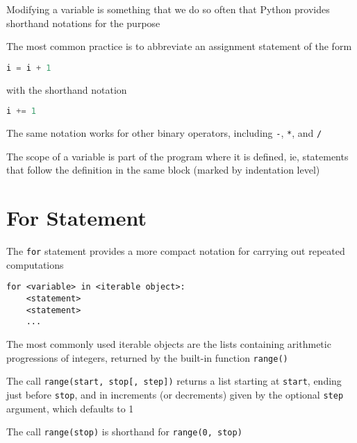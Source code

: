\documentclass[8pt,a4paper,compress]{beamer}
\begin{document}
\begin{frame}[fragile]
\pause

Modifying a variable is something that we do so often that Python provides shorthand notations for the purpose

\pause
\bigskip

The most common practice is to abbreviate an assignment statement of the form 

\begin{lstlisting}[language=Python]
i = i + 1
\end{lstlisting}

with the shorthand notation

\begin{lstlisting}[language=Python]
i += 1
\end{lstlisting}

\pause
\bigskip

The same notation works for other binary operators, including \lstinline{-}, \lstinline{*}, and \lstinline{/}

\pause
\bigskip

The scope of a variable is part of the program where it is defined, ie, statements that follow the definition in the same block (marked by indentation level)
\end{frame}

\section{For Statement}
\begin{frame}[fragile]
\pause

The \lstinline{for} statement provides a more compact notation for carrying out repeated computations

\pause
\smallskip

\begin{lstlisting}[language={}]
for <variable> in <iterable object>:
    <statement>
    <statement>
    ...
\end{lstlisting}

\pause
\bigskip

The most commonly used iterable objects are the lists containing arithmetic progressions of integers, returned by the built-in function \lstinline{range()}

\pause
\bigskip

The call \lstinline{range(start, stop[, step])} returns a list starting at \lstinline{start}, ending just before \lstinline{stop}, and in increments (or decrements) given by the optional \lstinline{step} argument, which defaults to 1

\pause
\bigskip

The call \lstinline{range(stop)} is shorthand for \lstinline{range(0, stop)}
\end{frame}
\end{document}
